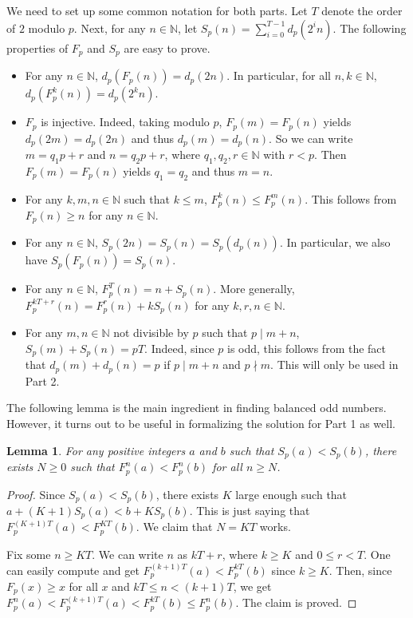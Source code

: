 \documentclass{article}
\newtheorem{lemma}[theorem]{Lemma}
\newcommand{\N}{\mathbb{N}}
\begin{document}
We need to set up some common notation for both parts.
Let $T$ denote the order of $2$ modulo $p$.
Next, for any $n \in \N$, let $S_p(n) = \displaystyle \sum_{i = 0}^{T - 1} d_p(2^i n)$.
The following properties of $F_p$ and $S_p$ are easy to prove.
\begin{itemize}

\item
For any $n \in \N$, $d_p(F_p(n)) = d_p(2n)$.
In particular, for all $n, k \in \N$, $d_p(F_p^k(n)) = d_p(2^k n)$.

\item
$F_p$ is injective.
Indeed, taking modulo $p$, $F_p(m) = F_p(n)$ yields $d_p(2m) = d_p(2n)$ and thus $d_p(m) = d_p(n)$.
So we can write $m = q_1 p + r$ and $n = q_2 p + r$, where $q_1, q_2, r \in \N$ with $r < p$.
Then $F_p(m) = F_p(n)$ yields $q_1 = q_2$ and thus $m = n$.

\item
For any $k, m, n \in \N$ such that $k \leq m$, $F_p^k(n) \leq F_p^m(n)$.
This follows from $F_p(n) \geq n$ for any $n \in \N$.

\item
For any $n \in \N$, $S_p(2n) = S_p(n) = S_p(d_p(n))$.
In particular, we also have $S_p(F_p(n)) = S_p(n)$.

\item
For any $n \in \N$, $F_p^T(n) = n + S_p(n)$.
More generally, $F_p^{kT + r}(n) = F_p^r(n) + k S_p(n)$ for any $k, r, n \in \N$.

\item
For any $m, n \in \N$ not divisible by $p$ such that $p \mid m + n$, $S_p(m) + S_p(n) = pT$.
Indeed, since $p$ is odd, this follows from the fact that $d_p(m) + d_p(n) = p$ if $p \mid m + n$ and $p \nmid m$.
This will only be used in Part 2.

\end{itemize}

The following lemma is the main ingredient in finding balanced odd numbers.
However, it turns out to be useful in formalizing the solution for Part 1 as well.

\begin{lemma}\label{2020n4-1}
For any positive integers $a$ and $b$ such that $S_p(a) < S_p(b)$, there exists $N \geq 0$ such that $F_p^n(a) < F_p^n(b)$ for all $n \geq N$.
\end{lemma}
\begin{proof}
Since $S_p(a) < S_p(b)$, there exists $K$ large enough such that $a + (K + 1) S_p(a) < b + K S_p(b)$.
This is just saying that $F_p^{(K + 1)T}(a) < F_p^{KT}(b)$.
We claim that $N = KT$ works.

Fix some $n \geq KT$.
We can write $n$ as $kT + r$, where $k \geq K$ and $0 \leq r < T$.
One can easily compute and get $F_p^{(k + 1)T}(a) < F_p^{kT}(b)$ since $k \geq K$.
Then, since $F_p(x) \geq x$ for all $x$ and $kT \leq n < (k + 1)T$, we get $F_p^n(a) < F_p^{(k + 1)T}(a) < F_p^{kT}(b) \leq F_p^n(b)$.
The claim is proved.
\end{proof}
\end{document}

